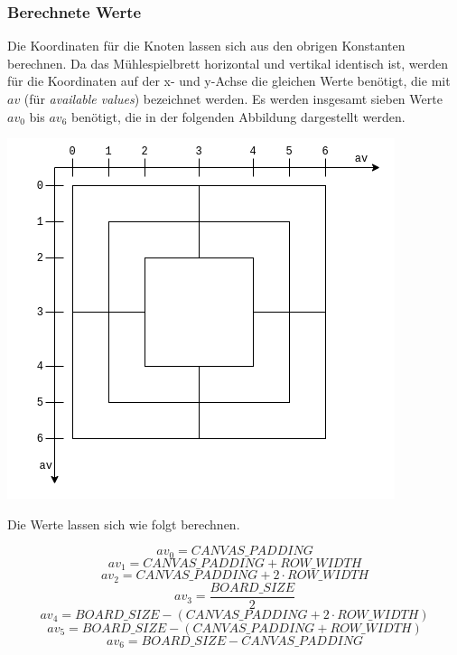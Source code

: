\documentclass[11pt]{article}
\begin{document}
    \hypertarget{berechnete-werte}{%
\subsubsection{Berechnete Werte}\label{berechnete-werte}}

Die Koordinaten für die Knoten lassen sich aus den obrigen Konstanten
berechnen. Da das Mühlespielbrett horizontal und vertikal identisch ist,
werden für die Koordinaten auf der x- und y-Achse die gleichen Werte
benötigt, die mit \(av\) (für \emph{available values}) bezeichnet
werden. Es werden insgesamt sieben Werte \(av_0\) bis \(av_6\) benötigt,
die in der folgenden Abbildung dargestellt werden.

\includegraphics{../images/nmm-av.png}

Die Werte lassen sich wie folgt berechnen.

\[ av_0 =  CANVAS\_PADDING \] \[ av_1 =  CANVAS\_PADDING + ROW\_WIDTH \]
\[ av_2 =  CANVAS\_PADDING + 2 \cdot ROW\_WIDTH \]
\[ av_3 =  \frac{BOARD\_SIZE}{2}\]
\[ av_4 =  BOARD\_SIZE - (CANVAS\_PADDING + 2 \cdot ROW\_WIDTH) \]
\[ av_5 =  BOARD\_SIZE - (CANVAS\_PADDING + ROW\_WIDTH)\]
\[ av_6 =  BOARD\_SIZE - CANVAS\_PADDING \]
\end{document}
